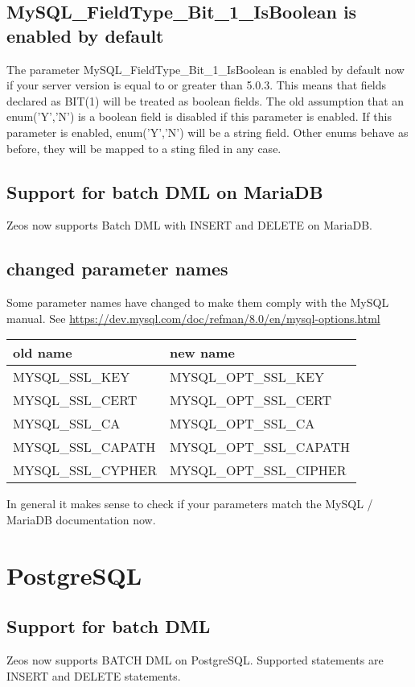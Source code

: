 \documentclass[a4paper,12pt,oneside]{article}
\begin{document}
\subsection{MySQL\_FieldType\_Bit\_1\_IsBoolean is enabled by default}

The parameter MySQL\_FieldType\_Bit\_1\_IsBoolean is enabled by default now if your server version is equal to or greater than 5.0.3.
This means that fields declared as BIT(1) will be treated as boolean fields.
The old assumption that an enum('Y','N') is a boolean field is disabled if this parameter is enabled.
If this parameter is enabled, enum('Y','N') will be a string field.
Other enums behave as before, they will be mapped to a sting filed in any case.

\subsection{Support for batch DML on MariaDB}
Zeos now supports Batch DML with INSERT and DELETE on MariaDB.

\subsection{changed parameter names}
Some parameter names have changed to make them comply with the MySQL manual.
See \url{https://dev.mysql.com/doc/refman/8.0/en/mysql-options.html}

\begin{tabular}{ll}
	old name & new name \\ \hline
  MYSQL\_SSL\_KEY & MYSQL\_OPT\_SSL\_KEY\\
	MYSQL\_SSL\_CERT & MYSQL\_OPT\_SSL\_CERT \\
	MYSQL\_SSL\_CA & MYSQL\_OPT\_SSL\_CA \\
	MYSQL\_SSL\_CAPATH & MYSQL\_OPT\_SSL\_CAPATH \\
	MYSQL\_SSL\_CYPHER & MYSQL\_OPT\_SSL\_CIPHER \\
\end{tabular}

In general it makes sense to check if your parameters match the MySQL / MariaDB documentation now.

\section{PostgreSQL}

\subsection{Support for batch DML}
Zeos now supports BATCH DML on PostgreSQL. 
Supported statements are INSERT and DELETE statements.
\end{document}

